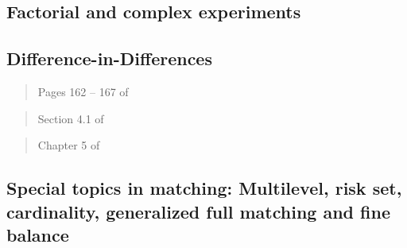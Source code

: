 \documentclass[12pt]{article}
\begin{document}

\subsection{Factorial and complex experiments}

\begin{verse}  \end{verse}

\begin{verse}  \end{verse}

\begin{verse}  \end{verse}

\begin{verse}  \end{verse}

\subsection{Difference-in-Differences}

\begin{verse} Pages 162 -- 167 of  \end{verse}

\begin{verse} Section 4.1 of  \end{verse}

\begin{verse} Chapter 5 of  \end{verse}

\begin{verse}  \end{verse}

\begin{verse}  \end{verse}

\begin{verse}  \end{verse}

\begin{verse}  \end{verse}

\subsection{Special topics in matching: Multilevel, risk set, cardinality, generalized full matching and fine balance}
\end{document}
